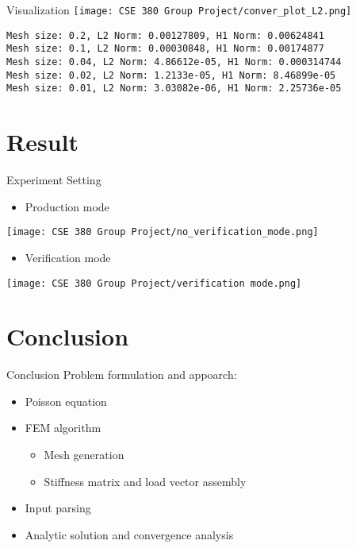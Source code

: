 \documentclass{beamer}
\begin{document}
\begin{frame}[fragile]{Visualization}
    \centering
    \texttt{[image: CSE 380 Group Project/conver\_plot\_L2.png]}
\small
\begin{verbatim}
Mesh size: 0.2, L2 Norm: 0.00127809, H1 Norm: 0.00624841
Mesh size: 0.1, L2 Norm: 0.00030848, H1 Norm: 0.00174877
Mesh size: 0.04, L2 Norm: 4.86612e-05, H1 Norm: 0.000314744
Mesh size: 0.02, L2 Norm: 1.2133e-05, H1 Norm: 8.46899e-05
Mesh size: 0.01, L2 Norm: 3.03082e-06, H1 Norm: 2.25736e-05
\end{verbatim}
\end{frame}


\section{Result}
\begin{frame}{Experiment Setting}

\begin{itemize}
    \item Production mode
    
\end{itemize}
\hspace{0.5cm}
    \texttt{[image: CSE 380 Group Project/no\_verification\_mode.png]}
    \begin{itemize}
        \item Verification mode
    \end{itemize}
    \hspace{0.5cm}
    \texttt{[image: CSE 380 Group Project/verification mode.png]}  
\end{frame}

\section{Conclusion}
\begin{frame}{Conclusion}
    Problem formulation and appoarch:
    \begin{itemize}
        \item Poisson equation
        \item FEM algorithm \begin{itemize}
            \item Mesh generation
            \item Stiffness matrix and load vector assembly
        \end{itemize}
        \item Input parsing
        \item Analytic solution and convergence analysis
    \end{itemize}
\end{frame}
\end{document}
